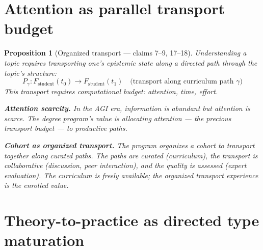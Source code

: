 \documentclass[11pt,a4paper]{article}
\newtheorem{proposition}[definition]{Proposition}
\begin{document}
\section{Attention as parallel transport budget}

\begin{proposition}[Organized transport --- claims 7--9, 17--18]
\label{prop:attention}
Understanding a topic requires transporting one's epistemic state along
a directed path through the topic's structure:
\[
  P_\gamma: F_{\text{student}}(t_0) \to F_{\text{student}}(t_1)
  \quad \text{(transport along curriculum path } \gamma\text{)}
\]
This transport requires computational budget: attention, time, effort.

\textbf{Attention scarcity.} In the AGI era, information is abundant but
attention is scarce. The degree program's value is allocating attention
--- the precious transport budget --- to productive paths.

\textbf{Cohort as organized transport.} The program organizes a cohort
to transport together along curated paths. The paths are curated
(curriculum), the transport is collaborative (discussion, peer
interaction), and the quality is assessed (expert evaluation). The
curriculum is freely available; the organized transport experience
is the enrolled value.
\end{proposition}


\section{Theory-to-practice as directed type maturation}
\label{sec:history}
\end{document}
